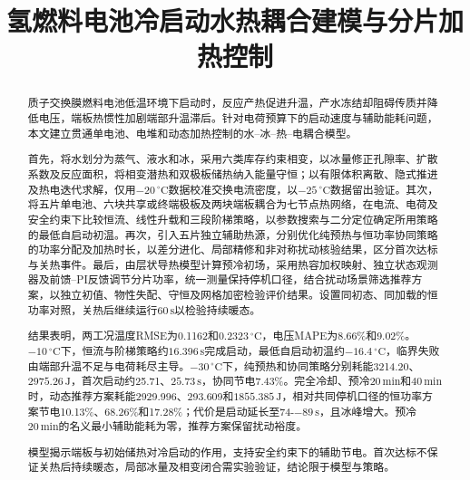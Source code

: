 \documentclass[bwprint]{gmcmthesis}
\title{氢燃料电池冷启动水热耦合建模与分片加热控制}
\numberwithin{equation}{section}
\numberwithin{figure}{section}
\begin{document}
 \maketitle
 \begin{abstract}
质子交换膜燃料电池低温环境下启动时，反应产热促进升温，产水冻结却阻碍传质并降低电压，端板热惯性加剧端部升温滞后。针对电荷预算下的启动速度与辅助能耗问题，本文建立贯通单电池、电堆和动态加热控制的水--冰--热--电耦合模型。

首先，将水划分为蒸气、液水和冰，采用六类库存约束相变，以冰量修正孔隙率、扩散系数及反应面积，将相变潜热和双极板储热纳入能量守恒；以有限体积离散、隐式推进及热电迭代求解，仅用$-20\,^\circ\mathrm C$数据校准交换电流密度，以$-25\,^\circ\mathrm C$数据留出验证。其次，将五片单电池、六块共享或终端极板及两块端板耦合为七节点热网络，在电流、电荷及安全约束下比较恒流、线性升载和三段阶梯策略，以参数搜索与二分定位确定所用策略的最低自启动初温。再次，引入五片独立辅助热源，分别优化纯预热与恒功率协同策略的功率分配及加热时长，以差分进化、局部精修和非对称扰动核验结果，区分首次达标与关热事件。最后，由层状导热模型计算预冷初场，采用热容加权映射、独立状态观测器及前馈--PI反馈调节分片功率，统一测量保持停机口径，结合扰动场景筛选推荐方案，以独立初值、物性失配、守恒及网格加密检验评价结果。设置同初态、同加载的恒功率对照，关热后继续运行$60\,\mathrm{s}$以检验持续暖态。

结果表明，两工况温度RMSE为0.1162和$0.2323\,^\circ\mathrm C$，电压MAPE为8.66\%和9.02\%。$-10\,^\circ\mathrm C$下，恒流与阶梯策略约$16.396\,\mathrm{s}$完成启动，最低自启动初温约$-16.4\,^\circ\mathrm C$，临界失败由端部升温不足与电荷耗尽主导。$-30\,^\circ\mathrm C$下，纯预热和协同策略分别耗能3214.20、$2975.26\,\mathrm{J}$，首次启动约25.71、$25.73\,\mathrm{s}$，协同节电7.43\%。完全冷却、预冷$20\,\mathrm{min}$和$40\,\mathrm{min}$时，动态推荐方案耗能2929.996、293.609和$1855.385\,\mathrm{J}$，相对共同停机口径的恒功率方案节电10.13\%、68.26\%和17.28\%；代价是启动延长至74-$-89\,\mathrm{s}$，且冰峰增大。预冷$20\,\mathrm{min}$的名义最小辅助能耗为零，推荐方案保留扰动裕度。

模型揭示端板与初始储热对冷启动的作用，支持安全约束下的辅助节电。首次达标不保证关热后持续暖态，局部冰量及相变闭合需实验验证，结论限于模型与策略。
\end{abstract}


\setcounter{tocdepth}{3}
\tableofcontents

\clearpage
\end{document}
